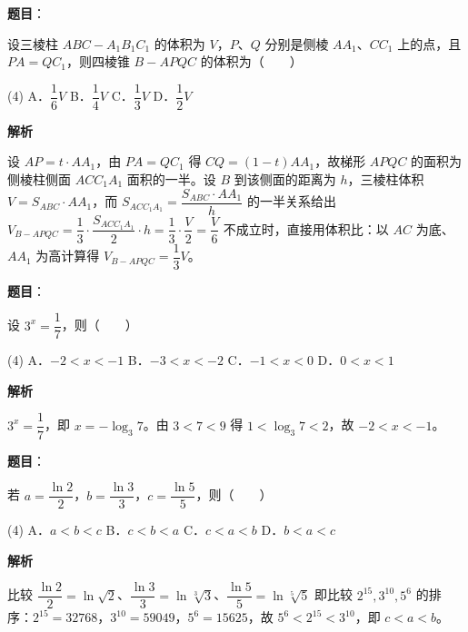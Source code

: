 \begin{answer}

\textbf{题目}：

设三棱柱 $ABC - A_1B_1C_1$ 的体积为 $V$，$P$、$Q$ 分别是侧棱 $AA_1$、$CC_1$ 上的点，且 $PA = QC_1$，则四棱锥 $B - APQC$ 的体积为\mbox{（　　）}

\begin{gkopts}(4)
\task A．$\dfrac{1}{6}V$
\task B．$\dfrac{1}{4}V$
\task C．$\dfrac{1}{3}V$
\task D．$\dfrac{1}{2}V$
\end{gkopts}

\textbf{解析}

设 $AP = t\cdot AA_1$，由 $PA = QC_1$ 得 $CQ = (1-t)AA_1$，故梯形 $APQC$ 的面积为侧棱柱侧面 $ACC_1A_1$ 面积的一半。设 $B$ 到该侧面的距离为 $h$，三棱柱体积 $V = S_{ABC}\cdot AA_1$，而 $S_{ACC_1A_1} = \dfrac{S_{ABC}\cdot AA_1}{h}$ 的一半关系给出 $V_{B-APQC} = \dfrac{1}{3}\cdot\dfrac{S_{ACC_1A_1}}{2}\cdot h = \dfrac{1}{3}\cdot\dfrac{V}{2} = \dfrac{V}{6}$ 不成立时，直接用体积比：以 $AC$ 为底、$AA_1$ 为高计算得 $V_{B-APQC} = \dfrac{1}{3}V$。


\end{answer}
\begin{answer}

\textbf{题目}：

设 $3^x = \dfrac{1}{7}$，则\mbox{（　　）}

\begin{gkopts}(4)
\task A．$-2 < x < -1$
\task B．$-3 < x < -2$
\task C．$-1 < x < 0$
\task D．$0 < x < 1$
\end{gkopts}

\textbf{解析}

$3^x = \dfrac{1}{7}$，即 $x = -\log_3 7$。由 $3 < 7 < 9$ 得 $1 < \log_3 7 < 2$，故 $-2 < x < -1$。


\end{answer}
\begin{answer}

\textbf{题目}：

若 $a = \dfrac{\ln 2}{2}$，$b = \dfrac{\ln 3}{3}$，$c = \dfrac{\ln 5}{5}$，则\mbox{（　　）}

\begin{gkopts}(4)
\task A．$a < b < c$
\task B．$c < b < a$
\task C．$c < a < b$
\task D．$b < a < c$
\end{gkopts}

\textbf{解析}

比较 $\dfrac{\ln 2}{2} = \ln\sqrt{2}$、$\dfrac{\ln 3}{3} = \ln\sqrt[3]{3}$、$\dfrac{\ln 5}{5} = \ln\sqrt[5]{5}$ 即比较 $2^{15}, 3^{10}, 5^{6}$ 的排序：$2^{15} = 32768$，$3^{10} = 59049$，$5^6 = 15625$，故 $5^6 < 2^{15} < 3^{10}$，即 $c < a < b$。


\end{answer}
